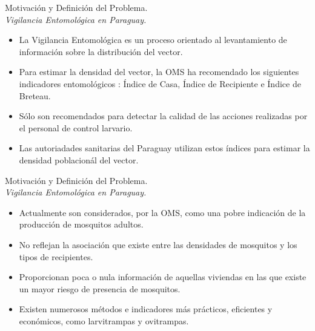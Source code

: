 
\begin{frame}[c]{Motivación y Definición del Problema.\\\textit{Vigilancia Entomológica en Paraguay.}}

    \begin{itemize}
      \item La Vigilancia Entomológica es un proceso orientado al levantamiento de información sobre la distribución del vector.

      \item Para estimar la densidad del vector, la OMS ha recomendado los siguientes indicadores entomológicos : Índice de Casa, Índice de Recipiente e Índice de Breteau.

      \item Sólo son recomendados para detectar la calidad de las acciones realizadas por el personal de control larvario.

      \item Las autoriadades sanitarias del Paraguay utilizan estos índices para estimar la densidad poblacionál del vector.

    \end{itemize}
\end{frame}

\begin{frame}[c]{Motivación y Definición del Problema.\\\textit{Vigilancia Entomológica en Paraguay.}}
\begin{itemize}
      \item Actualmente son considerados, por la OMS, como una pobre indicación de la producción de mosquitos adultos.

      \item No reflejan la asociación que existe entre las densidades de mosquitos y los tipos de recipientes.

      \item Proporcionan poca o nula información de aquellas viviendas en las que existe un mayor riesgo de presencia de mosquitos.

      \item Existen numerosos métodos e indicadores más prácticos, eficientes y económicos, como larvitrampas y ovitrampas.

    \end{itemize}
\end{frame}


